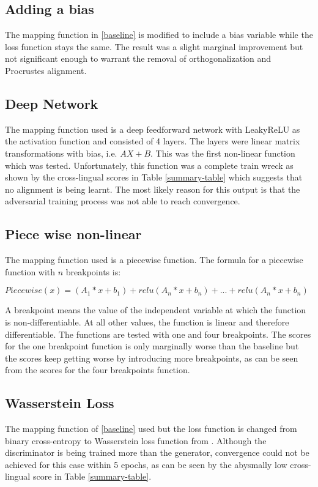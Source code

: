 \documentclass[11pt]{article}
\begin{document}
\subsection{Adding a bias}
The mapping function in \ref{baseline} is modified to include a bias variable while the loss function stays the same. The result was a slight marginal improvement but not significant enough to warrant the removal of orthogonalization and Procrustes alignment.

\subsection{Deep Network}
The mapping function used is a deep feedforward network with LeakyReLU as the activation function and consisted of 4 layers. The layers were linear matrix transformations with bias, i.e. $AX + B$. This was the first non-linear function which was tested. Unfortunately, this function was a complete train wreck as shown by the cross-lingual scores in Table \ref{summary-table} which suggests that no alignment is being learnt. The most likely reason for this output is that the adversarial training process was not able to reach convergence.

\subsection{Piece wise non-linear}
The mapping function used is a piecewise function. The formula for a piecewise function with $n$ breakpoints is:

$Piecewise(x) = (A_1*x + b_1) + relu(A_n*x + b_n) + ... + relu(A_n*x + b_n)$

A breakpoint means the value of the independent variable at which the function is non-differentiable. At all other values, the function is linear and therefore differentiable. The functions are tested with one and four breakpoints. The scores for the one breakpoint function is only marginally worse than the baseline but the scores keep getting worse by introducing more breakpoints, as can be seen from the scores for the four breakpoints function.

\subsection{Wasserstein Loss}
The mapping function of \ref{baseline} used but the loss function is changed from binary cross-entropy to Wasserstein loss function from \cite{arjovsky2017wasserstein}. Although the discriminator is being trained more than the generator, convergence could not be achieved for this case within 5 epochs, as can be seen by the abysmally low cross-lingual score in Table \ref{summary-table}.
\end{document}
